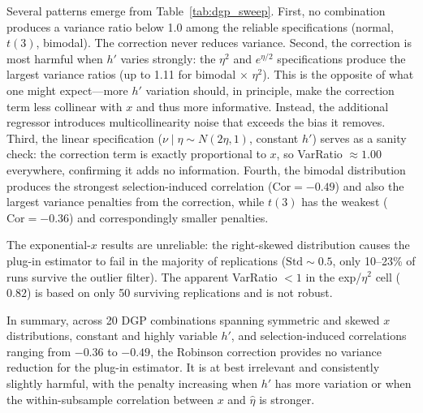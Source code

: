 Several patterns emerge from Table~\ref{tab:dgp_sweep}. First, no combination produces a variance ratio below 1.0 among the reliable specifications (normal, $t(3)$, bimodal). The correction never reduces variance. Second, the correction is most harmful when $h'$ varies strongly: the $\eta^2$ and $e^{\eta/2}$ specifications produce the largest variance ratios (up to 1.11 for bimodal $\times$ $\eta^2$). This is the opposite of what one might expect---more $h'$ variation should, in principle, make the correction term less collinear with $x$ and thus more informative. Instead, the additional regressor introduces multicollinearity noise that exceeds the bias it removes. Third, the linear specification ($\nu \mid \eta \sim N(2\eta,1)$, constant $h'$) serves as a sanity check: the correction term is exactly proportional to $x$, so VarRatio $\approx 1.00$ everywhere, confirming it adds no information. Fourth, the bimodal distribution produces the strongest selection-induced correlation ($\mathrm{Cor} = -0.49$) and also the largest variance penalties from the correction, while $t(3)$ has the weakest ($\mathrm{Cor} = -0.36$) and correspondingly smaller penalties.

The exponential-$x$ results are unreliable: the right-skewed distribution causes the plug-in estimator to fail in the majority of replications ($\mathrm{Std} \sim 0.5$, only 10--23\% of runs survive the outlier filter). The apparent VarRatio $< 1$ in the exp/$\eta^2$ cell ($0.82$) is based on only 50 surviving replications and is not robust.

In summary, across 20 DGP combinations spanning symmetric and skewed $x$ distributions, constant and highly variable $h'$, and selection-induced correlations ranging from $-0.36$ to $-0.49$, the Robinson correction provides no variance reduction for the plug-in estimator. It is at best irrelevant and consistently slightly harmful, with the penalty increasing when $h'$ has more variation or when the within-subsample correlation between $x$ and $\hat\eta$ is stronger.
